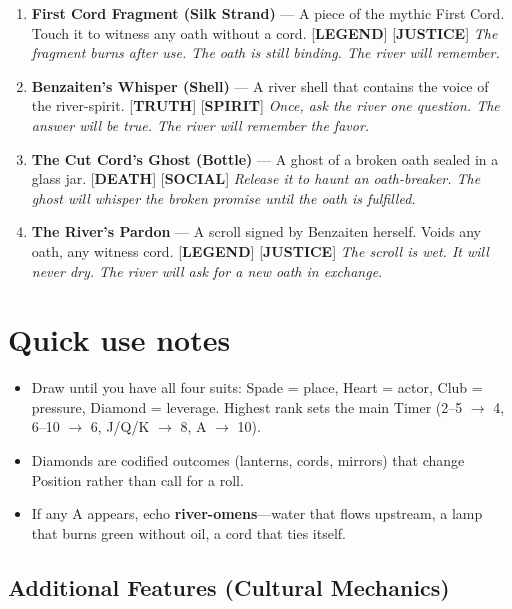 \begin{enumerate}
  \hfill \textit{The map is written on silk. The silk is a witness cord. Do not cut it.}
\item[J] \textbf{First Cord Fragment (Silk Strand)} --- A piece of the mythic First Cord. Touch it to witness any oath without a cord. [\textbf{LEGEND}] [\textbf{JUSTICE}]
  \hfill \textit{The fragment burns after use. The oath is still binding. The river will remember.}
\item[Q] \textbf{Benzaiten's Whisper (Shell)} --- A river shell that contains the voice of the river-spirit. [\textbf{TRUTH}] [\textbf{SPIRIT}]
  \hfill \textit{Once, ask the river one question. The answer will be true. The river will remember the favor.}
\item[K] \textbf{The Cut Cord's Ghost (Bottle)} --- A ghost of a broken oath sealed in a glass jar. [\textbf{DEATH}] [\textbf{SOCIAL}]
  \hfill \textit{Release it to haunt an oath-breaker. The ghost will whisper the broken promise until the oath is fulfilled.}
\item[A] \textbf{The River's Pardon} --- A scroll signed by Benzaiten herself. Voids any oath, any witness cord. [\textbf{LEGEND}] [\textbf{JUSTICE}]
  \hfill \textit{The scroll is wet. It will never dry. The river will ask for a new oath in exchange.}
\end{enumerate}

\section*{Quick use notes}
\label{sec:lethai-ar-quick-use-revised}
\begin{itemize}
\item Draw until you have all four suits: Spade = place, Heart = actor, Club = pressure, Diamond = leverage. Highest rank sets the main Timer (2--5 $\rightarrow$ 4, 6--10 $\rightarrow$ 6, J/Q/K $\rightarrow$ 8, A $\rightarrow$ 10).
\item Diamonds are codified outcomes (lanterns, cords, mirrors) that change Position rather than call for a roll.
\item If any A appears, echo \textbf{river-omens}---water that flows upstream, a lamp that burns green without oil, a cord that ties itself.
\end{itemize}

\subsection*{Additional Features (Cultural Mechanics)}
\label{sec:lethai-ar-mechanics-revised}

